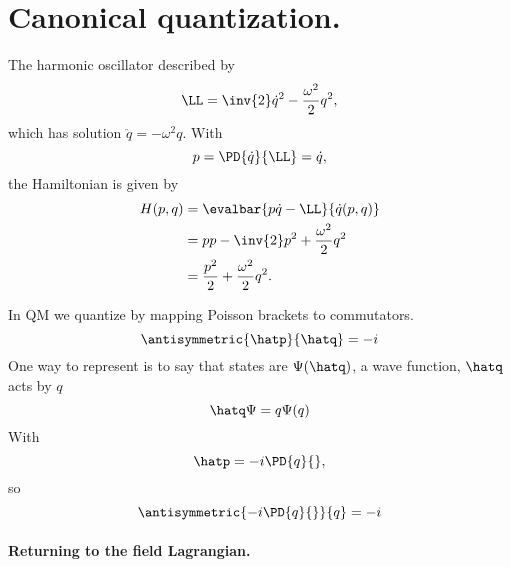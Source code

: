 %
%
\section{Canonical quantization.}

The harmonic oscillator described by
\begin{equation}\label{eqn:qftLecture4:740}
\LL = \inv{2} \dot{q}^2 - \frac{\omega^2}{2} q^2,
\end{equation}
which has solution \(\ddot{q} = - \omega^2 q\).
With
\begin{equation}\label{eqn:qftLecture4:760}
p = \PD{\dot{q}}{\LL} = \dot{q},
\end{equation}
the Hamiltonian is given by
\begin{equation}\label{eqn:qftLecture4:780}
\begin{aligned}
H(p,q)
&= \evalbar{p \dot{q} - \LL}{\dot{q}(p, q)} \\
&= p p - \inv{2} p^2 + \frac{\omega^2}{2} q^2 \\
&= \frac{p^2}{2} + \frac{\omega^2}{2} q^2.
\end{aligned}
\end{equation}

In QM we quantize by mapping Poisson brackets to commutators.
\begin{equation}\label{eqn:qftLecture4:800}
\antisymmetric{\hatp}{\hatq} = -i
\end{equation}
One way to represent is to say that states are \( \Psi(\hatq) \), a wave function, \( \hatq \) acts by \( q \)
\begin{equation}\label{eqn:qftLecture4:820}
\hatq \Psi = q \Psi(q)
\end{equation}
With
\begin{equation}\label{eqn:qftLecture4:840}
\hatp = -i \PD{q}{},
\end{equation}
so
\begin{equation}\label{eqn:qftLecture4:860}
\antisymmetric{ -i \PD{q}{} } { q} = -i
\end{equation}

\paragraph{Returning to the field Lagrangian.}

